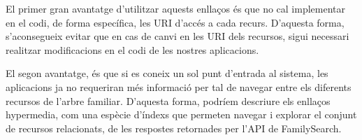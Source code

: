     El primer gran avantatge d’utilitzar aquests enllaços és que no cal implementar en el codi, de forma específica, les URI d'accés a cada recurs. D'aquesta forma, s'aconsegueix evitar que en cas de canvi en les URI dels recursos, sigui necessari realitzar modificacions en el codi de les nostres aplicacions.

    El segon avantatge, és que si es coneix un sol punt d’entrada al sistema, les aplicacions ja no requeriran més informació per tal de navegar entre els diferents recursos de l'arbre familiar. D'aquesta forma, podríem descriure els enllaços hypermedia, com una espècie d'índexs que permeten navegar i explorar el conjunt de recursos relacionats, de les respostes retornades per l'API de FamilySearch.
